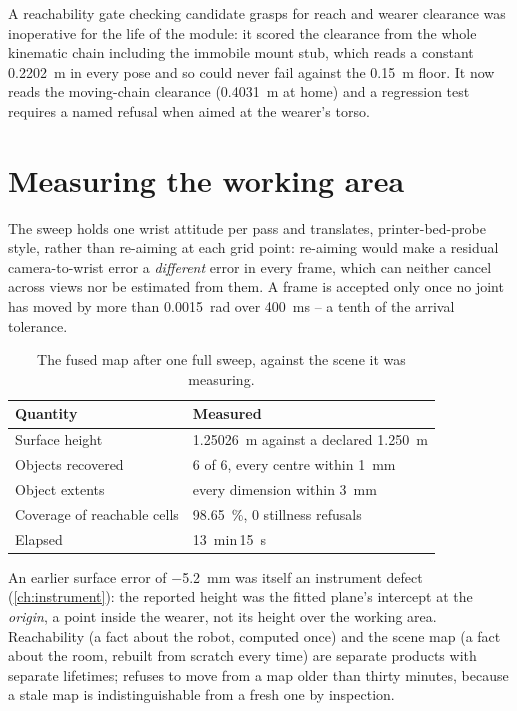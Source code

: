 A reachability gate checking candidate grasps for reach and wearer clearance
was inoperative for the life of the module: it scored the clearance from the
whole kinematic chain including the immobile mount stub, which reads a
constant \SI{0.2202}{\metre} in every pose and so could never fail against
the \SI{0.15}{\metre} floor. It now reads the moving-chain clearance
(\SI{0.4031}{\metre} at home) and a regression test requires a named refusal
when aimed at the wearer's torso.

\section{Measuring the working area}

The sweep holds one wrist attitude per pass and translates, printer-bed-probe
style, rather than re-aiming at each grid point: re-aiming would make a
residual camera-to-wrist error a \emph{different} error in every frame,
which can neither cancel across views nor be estimated from them. A frame is
accepted only once no joint has moved by more than \SI{0.0015}{\radian} over
\SI{400}{\milli\second} -- a tenth of the arrival tolerance.

\begin{table}[htbp]
  \centering
  \caption[Measured map accuracy]{The fused map after one full sweep, against
  the scene it was measuring.}
  \label{tab:map}
  \begin{tabular}{@{}ll@{}}
    \toprule
    Quantity & Measured \\
    \midrule
    Surface height & \SI{1.25026}{\metre} against a declared \SI{1.250}{\metre} \\
    Objects recovered & 6 of 6, every centre within \SI{1}{\milli\metre} \\
    Object extents & every dimension within \SI{3}{\milli\metre} \\
    Coverage of reachable cells & \SI{98.65}{\percent}, 0 stillness refusals \\
    Elapsed & \SI{13}{\minute}\,\SI{15}{\second} \\
    \bottomrule
  \end{tabular}
\end{table}

An earlier surface error of \SI{-5.2}{\milli\metre} was itself an instrument
defect (\cref{ch:instrument}): the reported height was the fitted plane's
intercept at the \emph{origin}, a point inside the wearer, not its height
over the working area. Reachability (a fact about the robot, computed once)
and the scene map (a fact about the room, rebuilt from scratch every time)
are separate products with separate lifetimes; 
refuses to move from a map older than thirty minutes, because a stale map is
indistinguishable from a fresh one by inspection.

